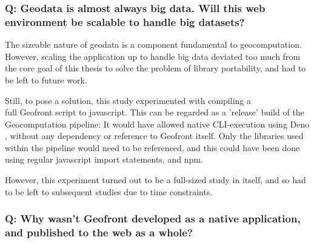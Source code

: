 \subsubsection*{Q: Geodata is almost always big data. Will this web environment be scalable to handle big datasets?}



The sizeable nature of geodata is a component fundamental to geocomputation.
However, scaling the application up to handle big data deviated too much from the core goal of this thesis to solve the problem of library portability, and had to be left to future work. 

Still, to pose a solution, this study experimented with compiling a \\ full Geofront script to javascript.
This can be regarded as a 'release' build of the Geocomputation pipeline: 
It would have allowed native CLI-execution using Deno \citep{contributors_deno_2022}, without any dependency or reference to Geofront itself.
Only the libraries used within the pipeline would need to be referenced, and this could have been done using regular javascript import statements, and npm.

However, this experiment turned out to be a full-sized study in itself, and so had to be left to subsequent studies due to time constraints. 

\subsubsection*{Q: Why wasn't Geofront developed as a native application, and published to the web as a whole?}

